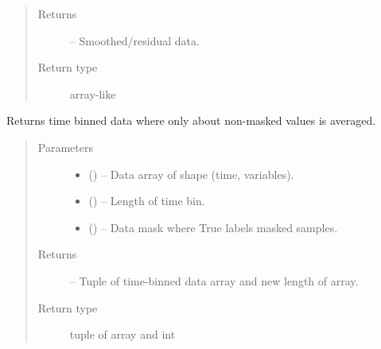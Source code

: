 \documentclass[letterpaper,10pt,english]{sphinxmanual}
\begin{document}
\begin{fulllineitems}
\begin{quote}
\begin{description}
\begin{itemize}
\end{itemize}

\item[{Returns}] \leavevmode
{} -- Smoothed/residual data.

\item[{Return type}] \leavevmode
array-like

\end{description}\end{quote}

\end{fulllineitems}


\begin{fulllineitems}
\label{\detokenize{index:tigramite.data_processing.time_bin_with_mask}}
Returns time binned data where only about non-masked values is averaged.
\begin{quote}\begin{description}
\item[{Parameters}] \leavevmode\begin{itemize}
\item {} 
 () -- Data array of shape (time, variables).

\item {} 
 () -- Length of time bin.

\item {} 
 (\sphinxstyleliteralemphasis{, }\sphinxstyleliteralemphasis{ (}\sphinxstyleliteralemphasis{)}\sphinxstyleliteralemphasis{}) -- Data mask where True labels masked samples.

\end{itemize}

\item[{Returns}] \leavevmode
{} -- Tuple of time-binned data array and new length of array.

\item[{Return type}] \leavevmode
tuple of array and int

\end{description}\end{quote}

\end{fulllineitems}
\end{document}
